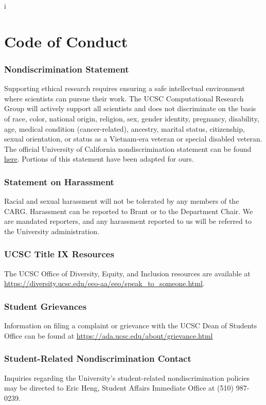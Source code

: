 i\section{Code of Conduct}
\label{sec:code_of_conduct}

\subsubsection{Nondiscrimination Statement}

Supporting ethical research requires ensuring a safe intellectual
environment where scientists can pursue their work. The UCSC
Computational Research Group will actively support all scientists
and does not discriminate on the 
basis of race, color, national origin, religion, sex, gender identity,
pregnancy, disability, age, medical condition (cancer-related), ancestry,
marital status, citizenship, sexual orientation, or status as a Vietnam-era
veteran or special disabled veteran.\\

\noindent
The official University of California nondiscrimination statement can
be found \href{https://www.ucop.edu/operating-budget/fees-and-enrollments/policies-and-resources/nondiscrimination-statement.html}{here}. Portions of this statement have been 
adapted for ours.

\subsubsection{Statement on Harassment}

Racial and sexual harassment will not be tolerated by any members of
the CARG. Harassment can be reported to Brant or to the Department Chair.
We are mandated reporters, and any harassment reported to us will be
referred to the University administration.\\


\subsubsection{UCSC Title IX Resources}

The UCSC Office of Diversity, Equity, and Inclusion resources are available at
\href{https://diversity.ucsc.edu/eeo-aa/eeo/speak_to_someone.html}{https://diversity.ucsc.edu/eeo-aa/eeo/speak\_to\_someone.html}.

\subsubsection{Student Grievances}
\label{sec:student_grievances}

\noindent
Information on filing a complaint or grievance with the UCSC Dean of Students Office
can be found at
\href{https://ada.ucsc.edu/about/grievance.html}{https://ada.ucsc.edu/about/grievance.html}

\subsubsection{Student-Related Nondiscrimination Contact}
Inquiries regarding the University's student-related nondiscrimination policies may be directed to Eric Heng, Student Affairs Immediate Office at (510) 987-0239.

